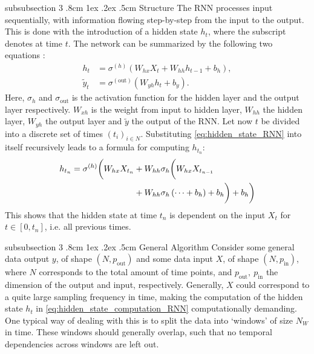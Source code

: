 \documentclass[%
reprint,
amsmath,amssymb,
aps,
]{revtex4-2}
\makeatletter
\renewcommand{\subsubsection}{%
	\@startsection
	{subsubsection}%
	{3}%
	{\z@}%
	{.8cm \@plus1ex \@minus .2ex}%
	{.5cm}%
	{\normalfont\small\centering}%
}
\makeatother
\begin{document}
\subsubsection{Structure}
The RNN processes input sequentially, with information flowing step-by-step from the input to the output. This is done with the introduction of a hidden state \(h_{t}\), where the subscript denotes at time \(t\). The network can be summarized by the following two equations \cite{tallec2017unbiasingtruncatedbackpropagationtime}:
\begin{subequations}
\begin{align}
	h_{t} &= \sigma^{(h)}\left(W_{hx}X_{t} + W_{hh}h_{t-1}  + b_{h}\right), \label{eq:hidden_state_RNN} \\
	\tilde{y}_{t} &= \sigma^{(\text{out})}\left(W_{yh}h_{t} + b_{y}\right).	\label{eq:output_RNN}
\end{align}
\end{subequations}
Here, \(\sigma_h\) and \(\sigma_{\text{out}}\) is the activation function for the hidden layer and the output layer respectively. \(W_{xh}\) is the weight from input to hidden layer, \(W_{hh}\) the hidden layer, \(W_{yh}\) the output layer and \(\tilde{y}\) the output of the RNN. Let now \(t\) be divided into a discrete set of times \((t_i)_{i\in N}\). Substituting \eqref{eq:hidden_state_RNN} into itself recursively leads to a formula for computing \(h_{t_n}\):
\begin{align}	\label{eq:hidden_state_computation_RNN}
	h_{t_n} = \sigma^{(h)}\biggl( W_{hx}X_{t_n} &+ W_{hh}\sigma_h \biggl( W_{hx}X_{t_{n-1}} \notag\\
	&+ W_{hh}\sigma_h \left(\dots + b_h\right) + b_h\biggr) 
	+b_h\biggr)
\end{align}
This shows that the hidden state at time \(t_n\) is dependent on the input \(X_{t}\) for \(t\in[0, t_n]\), i.e. all previous times. 

\subsubsection{General Algorithm}
Consider some general data output \(y\), of shape \((N, p_{\text{out}})\) and some data input \(X\), of shape \((N, p_{\text{in}})\), where \(N\) corresponds to the total amount of time points, and \(p_{\text{out}}, \ p_{\text{in}}\) the dimension of the output and input, respectively. Generally, \(X\) could correspond to a quite large sampling frequency in time, making the computation of the hidden state \(h_t\) in \eqref{eq:hidden_state_computation_RNN} computationally demanding. One typical way of dealing with this is to split the data into `windows' of size \(N_{W}\) in time. These windows should generally overlap, such that no temporal dependencies across windows are left out. 
\end{document}

